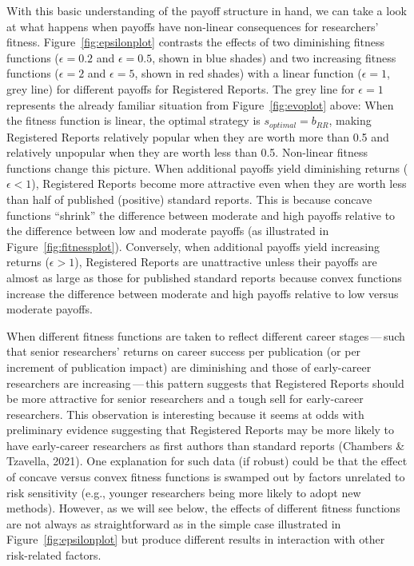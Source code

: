 \documentclass[
  ,man,mask,floatsintext]{apa6}
\begin{document}
With this basic understanding of the payoff structure in hand, we can take a look at what happens when payoffs have non-linear consequences for researchers' fitness.
Figure~\ref{fig:epsilonplot} contrasts the effects of two diminishing fitness functions (\(\epsilon = 0.2\) and \(\epsilon = 0.5\), shown in blue shades) and two increasing fitness functions (\(\epsilon = 2\) and \(\epsilon = 5\), shown in red shades) with a linear function (\(\epsilon = 1\), grey line) for different payoffs for Registered Reports.
The grey line for \(\epsilon = 1\) represents the already familiar situation from Figure~\ref{fig:evoplot} above:
When the fitness function is linear, the optimal strategy is \(s_{optimal} = b_{RR}\), making Registered Reports relatively popular when they are worth more than 0.5 and relatively unpopular when they are worth less than 0.5.
Non-linear fitness functions change this picture.
When additional payoffs yield diminishing returns (\(\epsilon <1\)), Registered Reports become more attractive even when they are worth less than half of published (positive) standard reports.
This is because concave functions ``shrink'' the difference between moderate and high payoffs relative to the difference between low and moderate payoffs (as illustrated in Figure~\ref{fig:fitnessplot}).
Conversely, when additional payoffs yield increasing returns (\(\epsilon > 1\)), Registered Reports are unattractive unless their payoffs are almost as large as those for published standard reports because convex functions increase the difference between moderate and high payoffs relative to low versus moderate payoffs.

When different fitness functions are taken to reflect different career stages\(\,\)---\(\,\)such that senior researchers' returns on career success per publication (or per increment of publication impact) are diminishing and those of early-career researchers are increasing\(\,\)---\(\,\)this pattern suggests that Registered Reports should be more attractive for senior researchers and a tough sell for early-career researchers.
This observation is interesting because it seems at odds with preliminary evidence suggesting that Registered Reports may be more likely to have early-career researchers as first authors than standard reports (Chambers \& Tzavella, 2021).
One explanation for such data (if robust) could be that the effect of concave versus convex fitness functions is swamped out by factors unrelated to risk sensitivity (e.g., younger researchers being more likely to adopt new methods).
However, as we will see below, the effects of different fitness functions are not always as straightforward as in the simple case illustrated in Figure~\ref{fig:epsilonplot} but produce different results in interaction with other risk-related factors.
\end{document}
